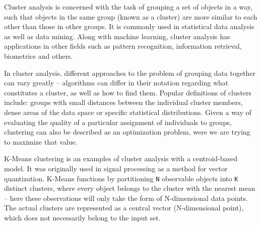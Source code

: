 \documentclass{l4proj}
\begin{document}
Cluster analysis is concerned with the task of grouping a set of objects in a way, such that objects in the same group (known as a cluster) are more similar to each other than those in other groups\cite{MLIntro}. It is commonly used in statistical data analysis as well as data mining. Along with machine learning, cluster analysis has applications in other fields such as pattern recognition, information retrieval, biometrics and others.

In cluster analysis, different approaches to the problem of grouping data together can vary greatly -- algorithms can differ in their notation regarding what constitutes a cluster, as well as how to find them. Popular definitions of clusters include: groups with small distances between the individual cluster members, dense areas of the data space or specific statistical distributions. Given a way of evaluating the quality of a particular assignment of individuals to groups, clustering can also be described as an optimization problem, were we are trying to maximize that value.

K-Means clustering is an examples of cluster analysis with a centroid-based model\cite{TopTen}. It was originally used in signal processing as a method for vector quantization. K-Means functions by partitioning \texttt{N} observable objects into \texttt{K} distinct clusters, where every object belongs to the cluster with the nearest mean  -- here these observations will only take the form of N-dimensional data points. The actual clusters are represented as a central vector (N-dimensional point), which does not necessarily belong to the input set.
\end{document}
